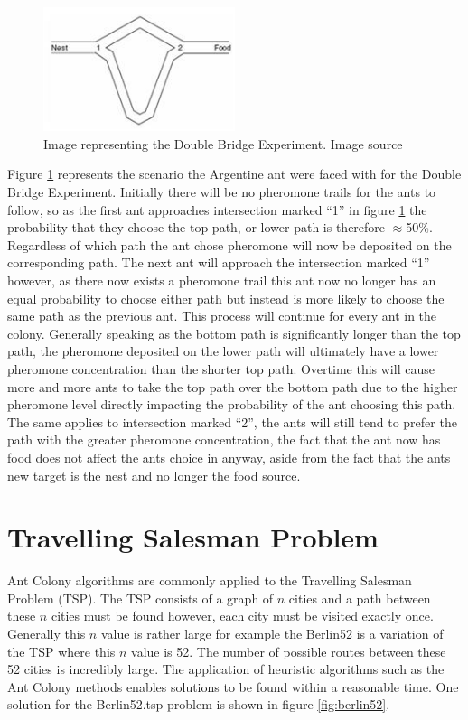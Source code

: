 \begin{figure}[h!]
\centering
\includegraphics[width=0.5\textwidth]{Images/chapter1/doublebridge}
\caption[Double Bridge Experiment]{Image representing the Double Bridge Experiment. Image source \cite{doublebridges:image}}
\label{fig:doublebridge}
\end{figure}

\noindent
Figure \ref{fig:doublebridge} represents the scenario the Argentine ant were faced with for the Double Bridge Experiment. Initially there will be no pheromone trails for the ants to follow, so as the first ant approaches intersection marked \enquote{1} in figure \ref{fig:doublebridge} the probability that they choose the top path, or lower path is therefore $\approx$50\%. Regardless of which path the ant chose pheromone will now be deposited on the corresponding path. The next ant will approach the intersection marked \enquote{1} however, as there now exists a pheromone trail this ant now no longer has an equal probability to choose either path but instead is more likely to choose the same path as the previous ant. This process will continue for every ant in the colony. Generally speaking as the bottom path is significantly longer than the top path, the pheromone deposited on the lower path will ultimately have a lower pheromone concentration than the shorter top path. Overtime this will cause more and more ants to take the top path over the bottom path due to the higher pheromone level directly impacting the probability of the ant choosing this path. The same applies to intersection marked \enquote{2}, the ants will still tend to prefer the path with the greater pheromone concentration, the fact that the ant now has food does not affect the ants choice in anyway, aside from the fact that the ants new target is the nest and no longer the food source.

\section{Travelling Salesman Problem}
\label{tsp}
Ant Colony algorithms are commonly applied to the Travelling Salesman Problem (TSP). The TSP consists of a graph of $n$ cities and a path between these $n$ cities must be found however, each city must be visited exactly once. Generally this $n$ value is rather large for example the Berlin52\cite{berlin52:source} is a variation of the TSP where this $n$ value is 52. The number of possible routes between these 52 cities is incredibly large. The application of heuristic algorithms such as the Ant Colony methods enables solutions to be found within a reasonable time. One solution for the Berlin52.tsp problem is shown in figure \ref{fig:berlin52}.

